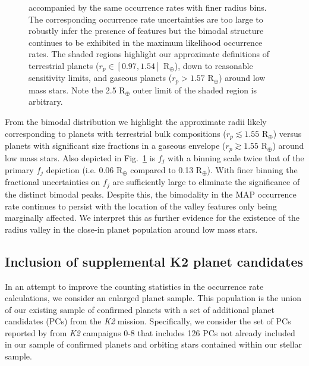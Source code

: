 \documentclass[twocolumn]{emulateapj}
\newcommand{\ktwo}[1]{\emph{K2}#1}
\begin{document}
\begin{figure}
{    accompanied by the same occurrence rates with finer radius bins.
    The corresponding occurrence rate uncertainties
    are too large to robustly infer the presence of features but the bimodal structure continues
    to be exhibited in the maximum likelihood occurrence rates. The shaded regions highlight our approximate
    definitions of terrestrial planets ($r_p \in [0.97,1.54]$ R$_{\oplus}$), down to reasonable sensitivity limits,
    and gaseous planets ($r_p > 1.57$ R$_{\oplus}$) around low mass stars. Note the 2.5 R$_{\oplus}$ outer limit of
    the shaded region is arbitrary.}
  \label{fig:rphist}
\end{figure}

From the bimodal distribution we highlight the approximate radii likely corresponding to planets with terrestrial
bulk compositions ($r_p\lesssim 1.55$ R$_{\oplus}$) versus planets with significant size fractions in a gaseous
envelope ($r_p\gtrsim 1.55$ R$_{\oplus}$) around
low mass stars. Also depicted in Fig.~\ref{fig:rphist} is $f_j$ with a binning scale twice that of the primary
$f_j$ depiction (i.e. 0.06 R$_{\oplus}$ compared to 0.13 R$_{\oplus}$).
With finer binning the fractional uncertainties on $f_j$ are sufficiently
large to eliminate the significance of the distinct bimodal peaks. Despite this, the bimodality in the MAP
occurrence rate continues to persist with the location of the valley features only being marginally affected.
We interpret this as further evidence for the existence of the radius valley in the close-in planet population
around low mass stars.


\subsection{Inclusion of supplemental K2 planet candidates}
In an attempt to improve the counting statistics in the occurrence rate calculations,
we consider an enlarged planet sample. This population is the union of our existing sample of confirmed planets
with a set of additional planet candidates (PCs) from the \ktwo{}
mission. Specifically, we consider the set of PCs reported by \cite{kruse19}
from \ktwo{} campaigns 0-8 that includes 126 PCs not already included in our sample of confirmed planets
and orbiting stars contained within our stellar sample.
\end{document}
